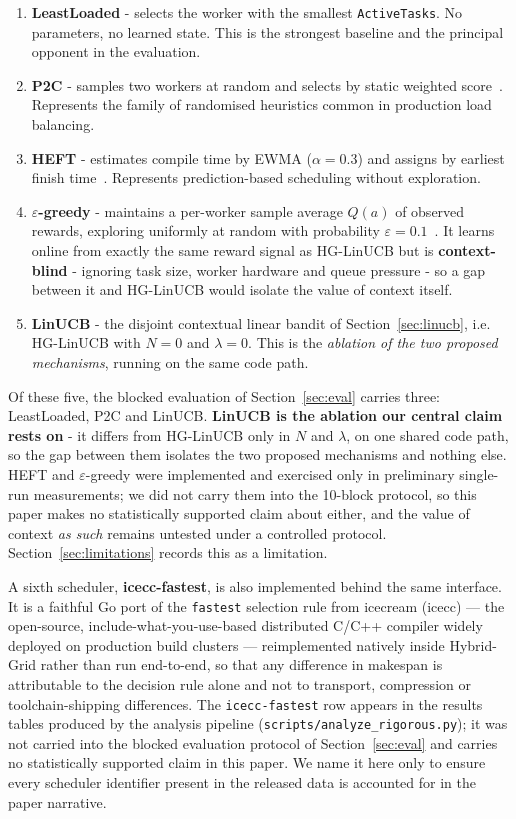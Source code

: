\documentclass[final,5p,times,twocolumn]{elsarticle}
\begin{document}
\begin{enumerate}
\item \textbf{LeastLoaded} - selects the worker with the smallest \texttt{ActiveTasks}. No parameters, no learned state. This is the strongest baseline and the principal opponent in the evaluation.
\item \textbf{P2C} - samples two workers at random and selects by static weighted score~\cite{mitzenmacher2001}. Represents the family of randomised heuristics common in production load balancing.
\item \textbf{HEFT} - estimates compile time by EWMA ($\alpha=0.3$) and assigns by earliest finish time~\cite{heft}. Represents prediction-based scheduling without exploration.
\item \textbf{$\varepsilon$-greedy} - maintains a per-worker sample average $Q(a)$ of observed rewards, exploring uniformly at random with probability $\varepsilon=0.1$~\cite{sutton2018}. It learns online from exactly the same reward signal as HG-LinUCB but is \textbf{context-blind} - ignoring task size, worker hardware and queue pressure - so a gap between it and HG-LinUCB would isolate the value of context itself.
\item \textbf{LinUCB} - the disjoint contextual linear bandit of Section~\ref{sec:linucb}, i.e. HG-LinUCB with $N=0$ and $\lambda=0$. This is the \emph{ablation of the two proposed mechanisms}, running on the same code path.
\end{enumerate}

Of these five, the blocked evaluation of Section~\ref{sec:eval} carries three: LeastLoaded, P2C and LinUCB. \textbf{LinUCB is the ablation our central claim rests on} - it differs from HG-LinUCB only in $N$ and $\lambda$, on one shared code path, so the gap between them isolates the two proposed mechanisms and nothing else. HEFT and $\varepsilon$-greedy were implemented and exercised only in preliminary single-run measurements; we did not carry them into the 10-block protocol, so this paper makes no statistically supported claim about either, and the value of context \emph{as such} remains untested under a controlled protocol. Section~\ref{sec:limitations} records this as a limitation.

A sixth scheduler, \textbf{icecc-fastest}, is also implemented behind the same interface. It is a faithful Go port of the \texttt{fastest} selection rule from icecream (icecc) --- the open-source, include-what-you-use-based distributed C/C++ compiler widely deployed on production build clusters --- reimplemented natively inside Hybrid-Grid rather than run end-to-end, so that any difference in makespan is attributable to the decision rule alone and not to transport, compression or toolchain-shipping differences. The \texttt{icecc-fastest} row appears in the results tables produced by the analysis pipeline (\texttt{scripts/analyze\_rigorous.py}); it was not carried into the blocked evaluation protocol of Section~\ref{sec:eval} and carries no statistically supported claim in this paper. We name it here only to ensure every scheduler identifier present in the released data is accounted for in the paper narrative.
\end{document}
